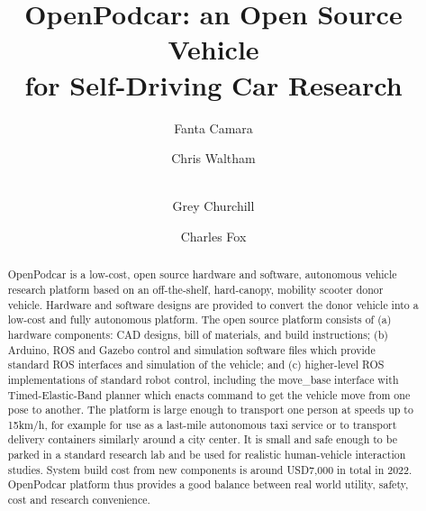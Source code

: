 \documentclass[a4paper]{article}
\title{OpenPodcar: an Open Source Vehicle \\for Self-Driving Car Research}
\author[1,2]{Fanta Camara}
\author[2]{Chris Waltham}
\author[2]{\\Grey Churchill} %
\author[1,2]{Charles Fox}
\affil[1]{Institute for Transport Studies, University of Leeds, UK}
\affil[2]{School of Computer Science, University of Lincoln, UK}
\begin{document}
	\maketitle
	
	
	\begin{abstract}
		OpenPodcar is a low-cost, open source hardware and software, autonomous vehicle research platform based on an off-the-shelf, hard-canopy, mobility scooter donor vehicle. Hardware and software designs are provided to convert the donor vehicle into a low-cost and fully autonomous platform. The open source platform consists of (a) hardware components: CAD designs, bill of materials, and build instructions; (b) Arduino, ROS and Gazebo control and simulation software files which provide standard ROS interfaces and simulation of the vehicle; and (c) higher-level ROS implementations of standard robot control, including the move\_base interface with Timed-Elastic-Band planner which enacts command to get the vehicle move from one pose to another. The platform is large enough to transport one person at speeds up to 15km/h, for example for use as a last-mile autonomous taxi service or to transport delivery containers similarly around a city center. It is small and safe enough to be parked in a standard research lab and be used for realistic human-vehicle interaction studies. System build cost from new components is around USD7,000 in total in 2022. OpenPodcar platform thus provides a good balance between real world utility, safety, cost and research convenience.
	\end{abstract}
	
\end{document}
